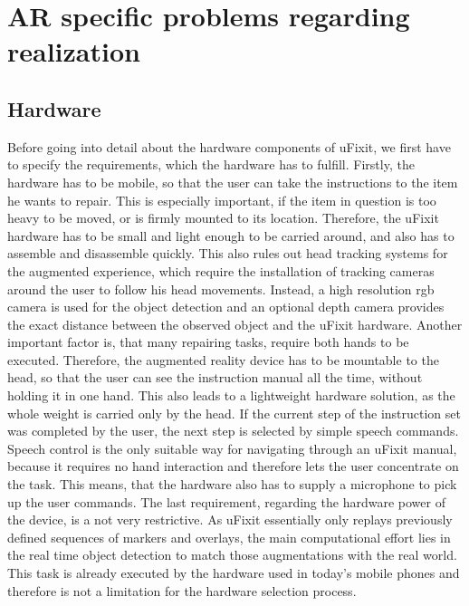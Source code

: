 
\chapter{AR specific problems regarding realization}

\section{Hardware}

Before going into detail about the hardware components of uFixit, we first have to specify the requirements, which the hardware has to fulfill. Firstly, the hardware has to be mobile, so that the user can take the instructions to the item he wants to repair. This is especially important, if the item in question is too heavy to be moved, or is firmly mounted to its location. Therefore, the uFixit hardware has to be small and light enough to be carried around, and also has to assemble and disassemble quickly.
This also rules out head tracking systems for the augmented experience, which require the installation of tracking cameras around the user to follow his head movements. Instead, a high resolution rgb camera is used for the object detection and an optional depth camera provides the exact distance between the observed object and the uFixit hardware.
Another important factor is, that many repairing tasks, require both hands to be executed. Therefore, the augmented reality device has to be mountable to the head, so that the user can see the instruction manual all the time, without holding it in one hand. This also leads to a lightweight hardware solution, as the whole weight is carried only by the head.
If the current step of the instruction set was completed by the user, the next step is selected by simple speech commands. Speech control is the only suitable way for navigating through an uFixit manual, because it requires no hand interaction and therefore lets the user concentrate on the task. This means, that the hardware also has to supply a microphone to pick up the user commands.
The last requirement, regarding the hardware power of the device, is a not very restrictive. As uFixit essentially only replays previously defined sequences of markers and overlays, the main computational effort lies in the real time object detection to match those augmentations with the real world. This task is already executed by the hardware used in today’s mobile phones and therefore  is not a limitation for the hardware selection process.

